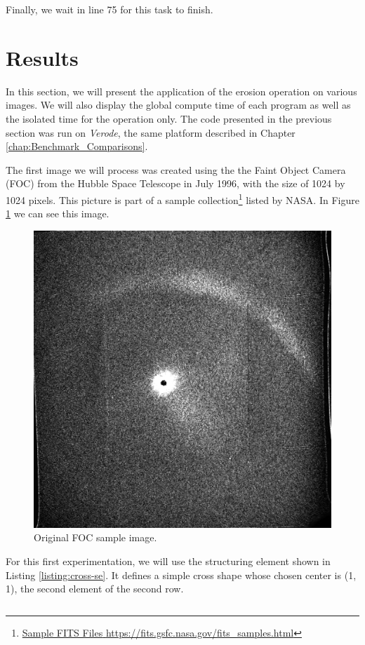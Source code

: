 Finally, we wait in line 75 for this task to finish.
\pagebreak

\section{Results}

In this section, we will present the application of the erosion operation on various images.
We will also display the global compute time of each program as well as the isolated time for the operation only.
The code presented in the previous section was run on \textit{Verode}, the same platform described in Chapter \ref{chap:Benchmark_Comparisons}.

The first image we will process was created using the the Faint Object Camera (FOC) from the Hubble Space Telescope in July 1996, with the size of 1024 by 1024 pixels.
This picture is part of a sample collection\footnote{\href{https://fits.gsfc.nasa.gov/fits\_samples.html}{{Sample FITS Files} \url{https://fits.gsfc.nasa.gov/fits\_samples.html}}} listed by NASA.
In Figure \ref{fig:og-foc} we can see this image.

\begin{figure}[H]
    \centering
    \includegraphics[width=0.5\linewidth]{images/og-foc.png}
    \caption{Original FOC sample image.}
    \label{fig:og-foc}
\end{figure}

For this first experimentation, we will use the structuring element shown in Listing \ref{listing:cross-se}. 
It defines a simple cross shape whose chosen center is (1, 1), the second element of the second row.

\begin{tabular}{c}

\end{tabular}

